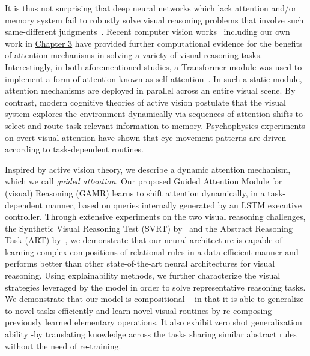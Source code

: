 It is thus not surprising that deep neural networks which lack attention and/or memory system fail to robustly solve visual reasoning problems that involve such same-different judgments~\citep{kim2018not}. Recent computer vision works~\citep{messina2021recurrent} including our own work in \hyperref[chapter1b]{Chapter 3} have provided further computational evidence for the benefits of attention mechanisms in solving a variety of visual reasoning tasks. Interestingly, in both aforementioned studies, a Transformer module was used to implement a form of attention known as self-attention~\citep{cheng2016long,parikh-etal-2016-decomposable}. In such a static module, attention mechanisms are deployed in parallel across an entire visual scene. By contrast, modern cognitive theories of active vision postulate that the visual system explores the environment dynamically  via sequences of attention shifts to select and route task-relevant information to memory. 
Psychophysics experiments \citep{hayhoe2000vision} on overt visual attention have shown that eye movement patterns are driven according to task-dependent routines. %


Inspired by active vision theory, we describe a dynamic attention mechanism, which we call \textit{guided attention}. Our proposed Guided Attention Module for (visual) Reasoning (GAMR) learns to shift attention dynamically, in a task-dependent manner, based on queries internally generated by an LSTM executive controller. Through extensive experiments on the two visual reasoning challenges, the Synthetic Visual Reasoning Test (SVRT) by~\citet{fleuret2011comparing} and the Abstract Reasoning Task (ART) by~\citet{Webb2021EmergentST}, we demonstrate that our neural architecture is capable of learning complex compositions of relational rules in a data-efficient manner and performs better than other state-of-the-art neural architectures for visual reasoning. Using explainability methods, we further characterize the visual strategies leveraged by the model in order to solve representative reasoning tasks. We demonstrate that our model is compositional -- in that it is able to generalize to novel tasks efficiently and learn novel visual routines by re-composing previously learned elementary operations. It also exhibit zero shot generalization ability -by translating knowledge across the tasks sharing similar abstract rules without the need of re-training.


